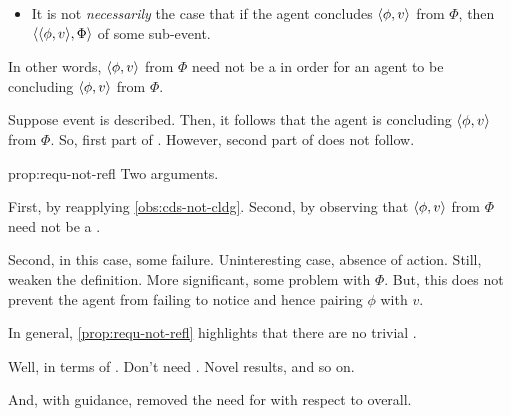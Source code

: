 \begin{note}
  \begin{proposition}
    \label{prop:requ-not-refl}

    \begin{itemize}
    \item
      It is not \emph{necessarily} the case that if the agent concludes \(\langle \phi, v \rangle\) from \(\Phi\), then \(\langle \langle \phi, v \rangle, \Phi \rangle\) \requ{} of some sub-event.
    \end{itemize}
    \vspace{-\baselineskip}
  \end{proposition}

  In other words, \(\langle \phi, v \rangle\) from \(\Phi\) need not be a \fc{} in order for an agent to be concluding \(\langle \phi, v \rangle\) from \(\Phi\).

  Suppose event is described.
    Then, it follows that the agent is concluding \(\langle \phi, v \rangle\) from \(\Phi\).
    So, first part of \fc{}.
    However, second part of \fc{} does not follow.

    \begin{argument}{prop:requ-not-refl}
      Two arguments.

      First, by reapplying \autoref{obs:cds-not-cldg}.
      Second, by observing that \(\langle \phi, v \rangle\) from \(\Phi\) need not be a \fc{}.

      Second, in this case, some failure.
      Uninteresting case, absence of action.
      Still, weaken the definition.
      More significant, some problem with \(\Phi\).
      But, this does not prevent the agent from failing to notice and hence pairing \(\phi\) with \(v\).
  \end{argument}

  In general, \autoref{prop:requ-not-refl} highlights that there are no trivial .

  Well, in terms of \tR{}.
  Don't need \tR{}.
  Novel results, and so on.

  And, with guidance, removed the need for \tR{} with respect to overall.
\end{note}

